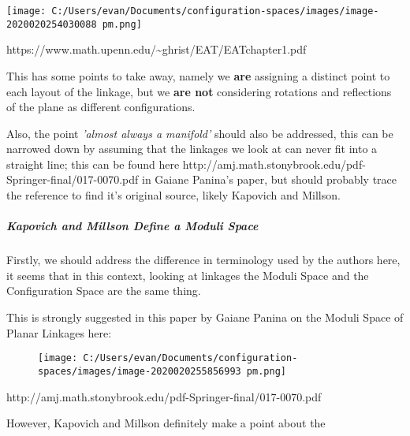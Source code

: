 \documentclass[
]{article}
\begin{document}
\texttt{[image: C:/Users/evan/Documents/configuration-spaces/images/image-2020020254030088 pm.png]}

https://www.math.upenn.edu/\textasciitilde ghrist/EAT/EATchapter1.pdf

This has some points to take away, namely we \textbf{are} assigning a
distinct point to each layout of the linkage, but we \textbf{are not}
considering rotations and reflections of the plane as different
configurations.

Also, the point \emph{'almost always a manifold'} should also be
addressed, this can be narrowed down by assuming that the linkages we
look at can never fit into a straight line; this can be found here
http://amj.math.stonybrook.edu/pdf-Springer-final/017-0070.pdf in Gaiane
Panina's paper, but should probably trace the reference to find it's
original source, likely Kapovich and Millson.

\hypertarget{header-n117}{%
\subparagraph{\texorpdfstring{\emph{Kapovich and Millson Define a Moduli
Space}}{Kapovich and Millson Define a Moduli Space}}\label{header-n117}}

Firstly, we should address the difference in terminology used by the
authors here, it seems that in this context, looking at linkages the
Moduli Space and the Configuration Space are the same thing.

This is strongly suggested in this paper by Gaiane Panina on the Moduli
Space of Planar Linkages here:

\begin{figure}
\centering
\texttt{[image: C:/Users/evan/Documents/configuration-spaces/images/image-2020020255856993 pm.png]}
\caption{}
\end{figure}

http://amj.math.stonybrook.edu/pdf-Springer-final/017-0070.pdf

However, Kapovich and Millson definitely make a point about the
\end{document}
